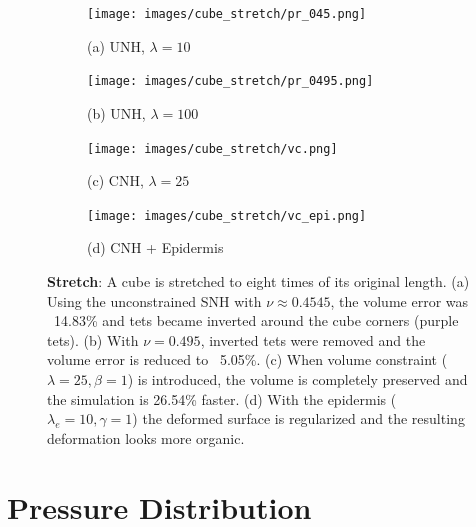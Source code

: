 \begin{figure}
	\centering
	\begin{subfigure}{1.0\linewidth}
		\centering
		{\texttt{[image: images/cube\_stretch/pr\_045.png]}}
		\caption*{(a) UNH, $\lambda = 10$}
		\label{sfig:stretch-snh10}
	\end{subfigure}\par\medskip
	\begin{subfigure}{1.0\linewidth}
		\centering
		{\texttt{[image: images/cube\_stretch/pr\_0495.png]}}
		\caption*{(b) UNH, $\lambda = 100$}
		\label{sfig:stretch-snh100}
	\end{subfigure}\par\medskip
	\begin{subfigure}{1.0\linewidth}
		\centering
		{\texttt{[image: images/cube\_stretch/vc.png]}}
		\caption*{(c) CNH, $\lambda = 25$}
		\label{sfig:stretch-vc}
	\end{subfigure}\par\medskip
	\begin{subfigure}{1.0\linewidth}
		\centering
		{\texttt{[image: images/cube\_stretch/vc\_epi.png]}}
		\caption*{(d) CNH + Epidermis}
		\label{sfig:stretch-vcepi}
	\end{subfigure}%
	\caption{\textbf{Stretch}: A cube is stretched to eight times of its original length. (a) Using the unconstrained SNH with $\nu \approx 0.4545$, the volume error was ~14.83\% and tets became inverted around the cube corners (purple tets). (b) With $\nu = 0.495$, inverted tets were removed and the volume error is reduced to ~5.05\%. (c) When volume constraint ($\lambda = 25, \beta = 1$) is introduced, the volume is completely preserved and the simulation is 26.54\% faster. (d) With the epidermis ($\lambda_e = 10, \gamma = 1$) the deformed surface is regularized and the resulting deformation looks more organic. }
	\label{fig:cube-stretch}
\end{figure}


\section{Pressure Distribution}

